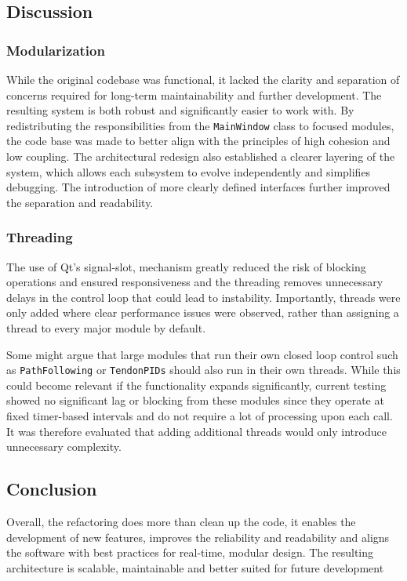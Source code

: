 \subsection{Discussion}
\subsubsection{Modularization}
While the original codebase was functional, it lacked the clarity and separation of concerns required for long-term maintainability and further development. The resulting system is both robust and significantly easier to work with. By redistributing the responsibilities from the \texttt{MainWindow} class to focused modules, the code base was made to better align with the principles of high cohesion and low coupling. The architectural redesign also established a clearer layering of the system, which allows each subsystem to evolve independently and simplifies debugging. The introduction of more clearly defined interfaces further improved the separation and readability.

\subsubsection{Threading}
The use of Qt's signal-slot, mechanism greatly reduced the risk of blocking operations and ensured responsiveness and the threading removes unnecessary delays in the control loop that could lead to instability. Importantly, threads were only added where clear performance issues were observed, rather than assigning a thread to every major module by default.

Some might argue that large modules that run their own closed loop control such as \texttt{PathFollowing} or \texttt{TendonPIDs} should also run in their own threads. While this could become relevant if the functionality expands significantly, current testing showed no significant lag or blocking from these modules since they operate at fixed timer-based intervals and do not require a lot of processing upon each call. It was therefore evaluated that adding additional threads would only introduce unnecessary complexity.

\subsection{Conclusion}
Overall, the refactoring does more than clean up the code, it enables the development of new features, improves the reliability and readability and aligns the software with best practices for real-time, modular design. The resulting architecture is scalable, maintainable and better suited for future development




